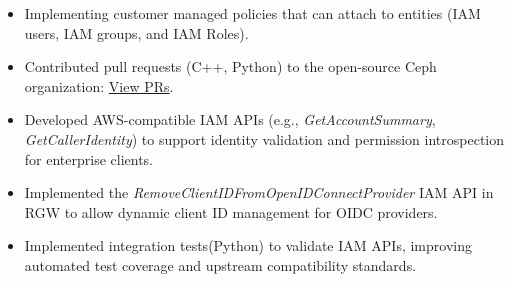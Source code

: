 \documentclass[10pt,a4paper,withhyper]{altacv}
\begin{document}
\tagline{}


\makecvheader



\begin{paracol}{2}


\begin{itemize}
   \item Implementing customer managed policies that can attach to entities (IAM users, IAM groups, and IAM Roles).
    \item Contributed pull requests (C++, Python) to the open-source Ceph organization: \href{https://tinyurl.com/ceph-prs}{View PRs}.
    \item Developed AWS-compatible IAM APIs (e.g., \textit{GetAccountSummary}, \textit{GetCallerIdentity}) to support identity validation and permission introspection for enterprise clients.
    \item Implemented the \textit{RemoveClientIDFromOpenIDConnectProvider} IAM API in RGW to allow dynamic client ID management for OIDC providers.
    \item Implemented integration tests(Python) to validate IAM APIs, improving automated test coverage and upstream compatibility standards.
\end{itemize}

\divider


\end{paracol}
\end{document}
